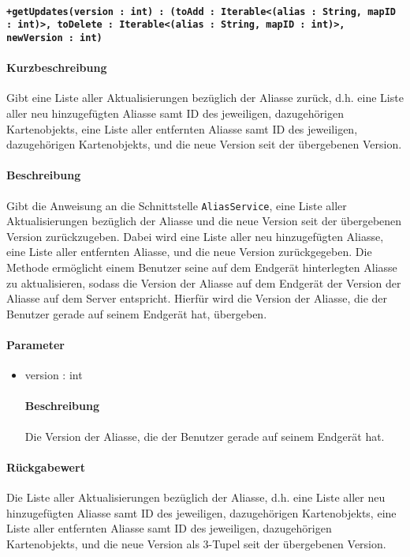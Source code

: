 \paragraph*{\texttt{+getUpdates(version : int) : (toAdd : Iterable<(alias : String, mapID : int)>, toDelete : Iterable<(alias : String, mapID : int)>, newVersion : int)}}%
\paragraph*{Kurzbeschreibung}
Gibt eine Liste aller Aktualisierungen bezüglich der Aliasse zurück, d.h. eine Liste aller neu hinzugefügten Aliasse samt ID des jeweiligen, dazugehörigen Kartenobjekts, eine Liste aller entfernten Aliasse samt ID des jeweiligen, dazugehörigen Kartenobjekts, und die neue Version seit der übergebenen Version.
\paragraph*{Beschreibung}
Gibt die Anweisung an die Schnittstelle \texttt{AliasService}, eine Liste aller Aktualisierungen bezüglich der Aliasse und die neue Version seit der übergebenen Version zurückzugeben. 
Dabei wird eine Liste aller neu hinzugefügten Aliasse, eine Liste aller entfernten Aliasse, und die neue Version zurückgegeben.
Die Methode ermöglicht einem Benutzer seine auf dem Endgerät hinterlegten Aliasse zu aktualisieren, sodass die Version der Aliasse auf dem Endgerät der Version der Aliasse auf dem Server entspricht.
Hierfür wird die Version der Aliasse, die der Benutzer gerade auf seinem Endgerät hat, übergeben.
\paragraph*{Parameter}
\begin{itemize}
    \item version : int
    		\paragraph*{Beschreibung}
    		Die Version der Aliasse, die der Benutzer gerade auf seinem Endgerät hat.
\end{itemize}
\paragraph*{Rückgabewert}
Die Liste aller Aktualisierungen bezüglich der Aliasse, d.h. eine Liste aller neu hinzugefügten Aliasse samt ID des jeweiligen, dazugehörigen Kartenobjekts, eine Liste aller entfernten Aliasse samt ID des jeweiligen, dazugehörigen Kartenobjekts, und die neue Version als 3-Tupel seit der übergebenen Version.
